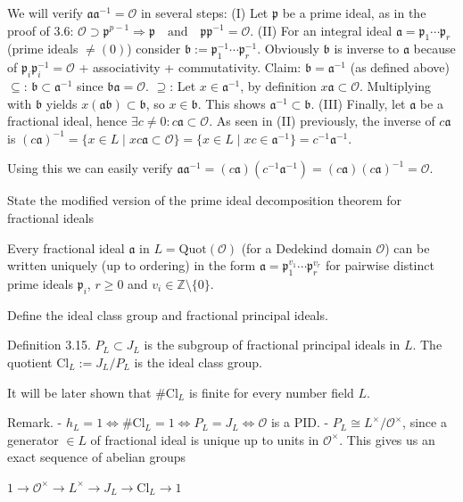 We will verify \(\mathfrak{a} \mathfrak{a}^{-1} = \mathcal{O}\) in several steps:
(I) Let \(\mathfrak{p}\) be a prime ideal, as in the proof of 3.6:
\(
\mathcal{O} \supset \mathfrak{p}^{p-1} \Rightarrow \mathfrak{p} \quad \text{and} \quad \mathfrak{p}\mathfrak{p}^{-1} = \mathcal{O}.
\)
(II) For an integral ideal \(\mathfrak{a} = \mathfrak{p}_1 \cdots \mathfrak{p}_r\) (prime ideals \(\neq (0)\)) consider 
\(\mathfrak{b} := \mathfrak{p}_1^{-1} \cdots \mathfrak{p}_r^{-1}\). 
Obviously \(\mathfrak{b}\) is inverse to \(\mathfrak{a}\) because of 
\(\mathfrak{p}_i \mathfrak{p}_i^{-1} = \mathcal{O}\) + associativity + commutativity.
Claim: \(\mathfrak{b} = \mathfrak{a}^{-1}\) (as defined above)
\(\subseteq\): \(\mathfrak{b} \subset \mathfrak{a}^{-1}\) since \(\mathfrak{b} \mathfrak{a} = \mathcal{O}\).
\(\supseteq\): Let \(x \in \mathfrak{a}^{-1}\), by definition \(x \mathfrak{a} \subset \mathcal{O}\). 
Multiplying with \(\mathfrak{b}\) yields \(x (\mathfrak{ab}) \subset \mathfrak{b}\), so \(x \in \mathfrak{b}\). 
This shows \(\mathfrak{a}^{-1} \subset \mathfrak{b}\).
(III) Finally, let \(\mathfrak{a}\) be a fractional ideal, hence \(\exists c \neq 0 : c\mathfrak{a} \subset \mathcal{O}\). 
As seen in (II) previously, the inverse of \(c\mathfrak{a}\) is
\(
(c\mathfrak{a})^{-1} = \{ x \in L \mid x c \mathfrak{a} \subset \mathcal{O} \} = \{ x \in L \mid x c \in \mathfrak{a}^{-1} \} = c^{-1} \mathfrak{a}^{-1}
\).

Using this we can easily verify
\(
\mathfrak{a} \mathfrak{a}^{-1} = (c\mathfrak{a})(c^{-1} \mathfrak{a}^{-1}) = (c\mathfrak{a})(c\mathfrak{a})^{-1} = \mathcal{O}.
\)


State the modified version of the prime ideal decomposition theorem for fractional ideals

Every fractional ideal \( \mathfrak{a} \) in \( L = \text{Quot}(\mathcal{O})\) 
(for a Dedekind domain \( \mathcal{O} \)) can be written uniquely (up to ordering) in the form 
\( \mathfrak{a} = \mathfrak{p}^{v_1}_1 \cdots \mathfrak{p}^{v_r}_r\) for pairwise
distinct prime ideals \( \mathfrak{p}_i \), \( r \geq 0 \) and \( v_i \in \mathbb{Z} \setminus \{0\}\).


Define the ideal class group and fractional principal ideals.

Definition 3.15. 
\( P_L \subset J_L \) is the subgroup of fractional principal ideals in \( L \). 
The quotient \(\text{Cl}_L := J_L / P_L\) is the ideal class group.

It will be later shown that \(\# \text{Cl}_L\) is finite for every number field \( L \).

Remark.
- \( h_L = 1 \Leftrightarrow \# \text{Cl}_L = 1 \Leftrightarrow P_L = J_L \Leftrightarrow \mathcal{O}\) is a PID.
- \( P_L \cong L^\times / \mathcal{O}^\times\), since a generator \(\in L\) of fractional ideal is unique up to units in \(\mathcal{O}^\times\). 
This gives us an exact sequence of abelian groups

\(
1 \longrightarrow \mathcal{O}^\times \longrightarrow L^\times \longrightarrow J_L \longrightarrow \text{Cl}_L \longrightarrow 1
\)


